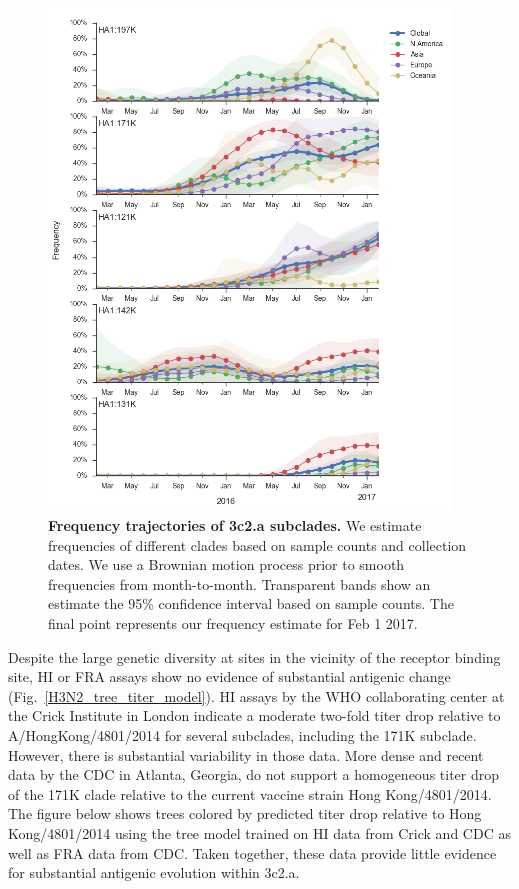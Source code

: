 \documentclass[11pt,oneside,letterpaper]{article}
\begin{document}
\pagebreak

\begin{figure}[H]
	\centering
	\includegraphics[width=0.95\textwidth]{../figures/feb-2017/H3N2_mutations.png}
	\caption{\textbf{Frequency trajectories of 3c2.a subclades.}
	We estimate frequencies of different clades based on sample counts and collection dates.
	We use a Brownian motion process prior to smooth frequencies from month-to-month.
	Transparent bands show an estimate the 95\% confidence interval based on sample counts.
	The final point represents our frequency estimate for Feb 1 2017.
	}
	\label{H3N2_mutations}
\end{figure}

\pagebreak

Despite the large genetic diversity at sites in the vicinity of the receptor binding site, HI or FRA assays show no evidence of substantial antigenic change (Fig.\ \ref{H3N2_tree_titer_model}).
HI assays by the WHO collaborating center at the Crick Institute in London indicate a moderate two-fold titer drop relative to A/HongKong/4801/2014 for several subclades, including the 171K subclade.
However, there is substantial variability in those data.
More dense and recent data by the CDC in Atlanta, Georgia, do not support a homogeneous titer drop of the 171K clade relative to the current vaccine strain Hong Kong/4801/2014.
The figure below shows trees colored by predicted titer drop relative to Hong Kong/4801/2014 using the tree model \cite{neher2015prediction} trained on HI data from Crick and CDC as well as FRA data from CDC.
Taken together, these data provide little evidence for substantial antigenic evolution within 3c2.a.
\end{document}
